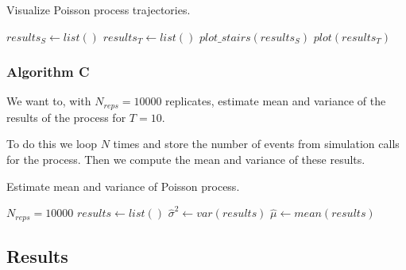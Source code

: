 \begin{algorithm}[H]
   \label{alg:3B}
   \caption{Visualize Poisson process trajectories.}
   $results_S \gets list()$ 
   $results_T \gets list()$ 
   $plot\_stairs(results_S)$ 
   $plot(results_T)$ 
\end{algorithm}

\subsubsection{Algorithm C}
\label{sec:alg3C}

We want to, with $N_{reps} = 10000$ replicates, estimate mean and variance of the results of the process for $T=10$.

To do this we loop $N$ times and store the number of events from simulation calls for the process. Then we compute the mean and variance of these results.

\begin{algorithm}[H]
   \label{alg:3C}
   \caption{Estimate mean and variance of Poisson process.}
   $N_{reps} = 10000$ \;
   $results \gets list()$ \;
   $\hat{\sigma}^2 \gets var(results)$ \;
   $\hat{\mu} \gets mean(results)$ \;
\end{algorithm}

\subsection{Results}
\label{sec:res3}



